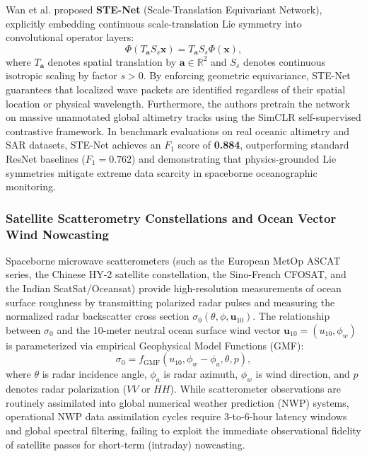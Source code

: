 Wan et al. proposed \textbf{STE-Net} (Scale-Translation Equivariant Network), explicitly embedding continuous scale-translation Lie symmetry into convolutional operator layers:
\begin{equation}
    \Phi(T_{\mathbf{a}} S_s \mathbf{x}) = T_{\mathbf{a}} S_s \Phi(\mathbf{x}),
    \label{eq:ste_equivariance}
\end{equation}
where $T_{\mathbf{a}}$ denotes spatial translation by $\mathbf{a} \in \mathbb{R}^2$ and $S_s$ denotes continuous isotropic scaling by factor $s > 0$. By enforcing geometric equivariance, STE-Net guarantees that localized wave packets are identified regardless of their spatial location or physical wavelength. Furthermore, the authors pretrain the network on massive unannotated global altimetry tracks using the SimCLR self-supervised contrastive framework. In benchmark evaluations on real oceanic altimetry and SAR datasets, STE-Net achieves an $F_1$ score of \textbf{0.884}, outperforming standard ResNet baselines ($F_1 = 0.762$) and demonstrating that physics-grounded Lie symmetries mitigate extreme data scarcity in spaceborne oceanographic monitoring.

\subsubsection{Satellite Scatterometry Constellations and Ocean Vector Wind Nowcasting}
Spaceborne microwave scatterometers (such as the European MetOp ASCAT series, the Chinese HY-2 satellite constellation, the Sino-French CFOSAT, and the Indian ScatSat/Oceansat) provide high-resolution measurements of ocean surface roughness by transmitting polarized radar pulses and measuring the normalized radar backscatter cross section $\sigma_0(\theta, \phi, \mathbf{u}_{10})$. The relationship between $\sigma_0$ and the 10-meter neutral ocean surface wind vector $\mathbf{u}_{10} = (u_{10}, \phi_w)$ is parameterized via empirical Geophysical Model Functions (GMF):
\begin{equation}
    \sigma_0 = f_{\text{GMF}}(u_{10}, \phi_w - \phi_a, \theta, p),
    \label{eq:gmf_formulation}
\end{equation}
where $\theta$ is radar incidence angle, $\phi_a$ is radar azimuth, $\phi_w$ is wind direction, and $p$ denotes radar polarization ($VV$ or $HH$). While scatterometer observations are routinely assimilated into global numerical weather prediction (NWP) systems, operational NWP data assimilation cycles require 3-to-6-hour latency windows and global spectral filtering, failing to exploit the immediate observational fidelity of satellite passes for short-term (intraday) nowcasting.

